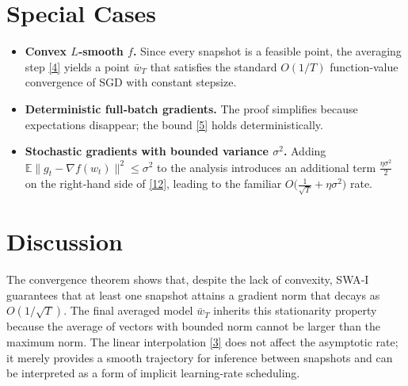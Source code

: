 \documentclass{article}
\begin{document}
\section*{Special Cases}
\begin{itemize}
\item \textbf{Convex $L$‑smooth $f$.}  Since every snapshot is a feasible point,
the averaging step \eqref{4} yields a point $\bar w_{T}$ that satisfies the
standard $O(1/T)$ function‑value convergence of SGD with constant stepsize.
\item \textbf{Deterministic full‑batch gradients.}  The proof simplifies
because expectations disappear; the bound \eqref{5} holds deterministically.
\item \textbf{Stochastic gradients with bounded variance $\sigma^{2}$.}
  Adding $\mathbb{E}\|g_{t}-\nabla f(w_{t})\|^{2}\le\sigma^{2}$ to the
  analysis introduces an additional term $\frac{\eta\sigma^{2}}{2}$ on the
  right‑hand side of \eqref{12}, leading to the familiar
  $O\bigl(\frac{1}{\sqrt{T}}+\eta\sigma^{2}\bigr)$ rate.
\end{itemize}

\section*{Discussion}
The convergence theorem shows that, despite the lack of convexity,
SWA‑I guarantees that at least one snapshot attains a gradient norm that
decays as $O(1/\sqrt{T})$.  The final averaged model $\bar w_{T}$ inherits
this stationarity property because the average of vectors with bounded
norm cannot be larger than the maximum norm.  The linear interpolation
\eqref{3} does not affect the asymptotic rate; it merely provides a
smooth trajectory for inference between snapshots and can be interpreted
as a form of implicit learning‑rate scheduling.
\end{document}
